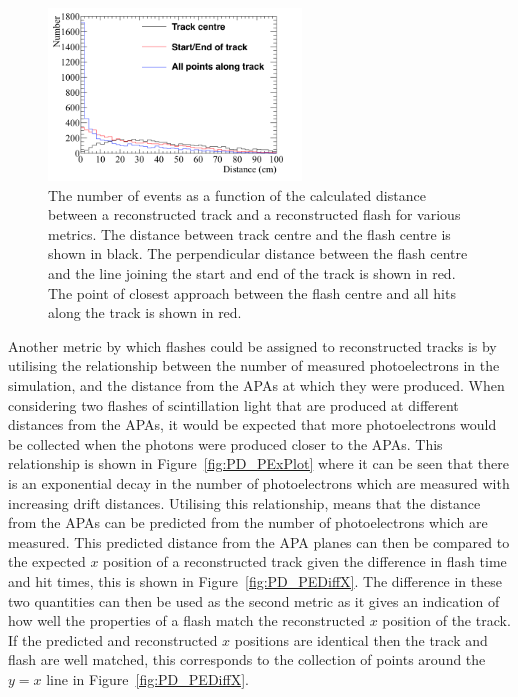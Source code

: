 \begin{figure}[h!]
  \centering
  \includegraphics[width=0.6\textwidth]{DiffTrackSeps}
  \caption[Matching tracks and flashes in the 35 ton using positions in the $yz$ plane]
          {The number of events as a function of the calculated distance between a reconstructed track and a reconstructed flash for various metrics. The distance between track centre and the flash centre is shown in black. The perpendicular distance between the flash centre and the line joining the start and end of the track is shown in red. The point of closest approach between the flash centre and all hits along the track is shown in red.}
  \label{fig:PDYZDist}
\end{figure}

Another metric by which flashes could be assigned to reconstructed tracks is by utilising the relationship between the number of measured photoelectrons in the simulation, and the distance from the APAs at which they were produced. When considering two flashes of scintillation light that are produced at different distances from the APAs, it would be expected that more photoelectrons would be collected when the photons were produced closer to the APAs. This relationship is shown in Figure~\ref{fig:PD_PExPlot} where it can be seen that there is an exponential decay in the number of photoelectrons which are measured with increasing drift distances. Utilising this relationship, means that the distance from the APAs can be predicted from the number of photoelectrons which are measured. This predicted distance from the APA planes can then be compared to the expected $x$ position of a reconstructed track given the difference in flash time and hit times, this is shown in Figure~\ref{fig:PD_PEDiffX}. The difference in these two quantities can then be used as the second metric as it gives an indication of how well the properties of a flash match the reconstructed $x$ position of the track. If the predicted and reconstructed $x$ positions are identical then the track and flash are well matched, this corresponds to the collection of points around the $y=x$ line in Figure~\ref{fig:PD_PEDiffX}. \\

